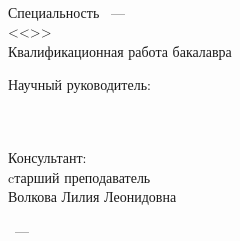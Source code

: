 
\thispagestyle{empty}%
\begin{center}%
    \MakeUppercase{\thesisOrganization}
\end{center}%

\vspace{0pt plus1fill} %
\begin{center}%
    {\large \thesisAuthor}
\end{center}%

\vspace{0pt plus1fill} %
\begin{center}%
    \textbf {\large \thesisTitle} \\
    \vspace{0pt plus4fill} %
    {%
        Специальность \thesisSpecialtyNumber~--- \\
        <<\thesisSpecialtyTitle>> \\
    }
    \vspace{0pt plus4fill} %
    {
        Квалификационная работа бакалавра \\
    }
\end{center}%

\vspace{0pt plus6fill} %
\begin{flushright}%
    Научный руководитель: \\
    \supervisorRegalia \\
    \supervisorFio \\
\end{flushright}%

\vspace{0pt plus1fill} %
\begin{flushright}%
    Консультант: \\
    cтарший преподаватель \\
    Волкова Лилия Леонидовна \\
\end{flushright}%

\vspace{0pt plus4fill} %
\begin{center}%
    {\thesisCity~--- \thesisYear}
\end{center}%

\newpage
